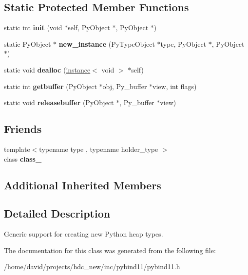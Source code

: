 \subsection*{Static Protected Member Functions}
\begin{DoxyCompactItemize}
\item 
static int {\bfseries init} (void $\ast$self, Py\+Object $\ast$, Py\+Object $\ast$)\hypertarget{classgeneric__type_acea3e51d079afc632cfb4514533e02d4}{}\label{classgeneric__type_acea3e51d079afc632cfb4514533e02d4}

\item 
static Py\+Object $\ast$ {\bfseries new\+\_\+instance} (Py\+Type\+Object $\ast$type, Py\+Object $\ast$, Py\+Object $\ast$)\hypertarget{classgeneric__type_ac4f8c2c592be8b4724591f65e5382a1c}{}\label{classgeneric__type_ac4f8c2c592be8b4724591f65e5382a1c}

\item 
static void {\bfseries dealloc} (\hyperlink{structinstance}{instance}$<$ void $>$ $\ast$self)\hypertarget{classgeneric__type_ad92581a3039032a4467720bd394b262a}{}\label{classgeneric__type_ad92581a3039032a4467720bd394b262a}

\item 
static int {\bfseries getbuffer} (Py\+Object $\ast$obj, Py\+\_\+buffer $\ast$view, int flags)\hypertarget{classgeneric__type_a34b0cf2e5806a0b9cb34f198d6bed13d}{}\label{classgeneric__type_a34b0cf2e5806a0b9cb34f198d6bed13d}

\item 
static void {\bfseries releasebuffer} (Py\+Object $\ast$, Py\+\_\+buffer $\ast$view)\hypertarget{classgeneric__type_aef00cb6d627ee107186379806172aeb5}{}\label{classgeneric__type_aef00cb6d627ee107186379806172aeb5}

\end{DoxyCompactItemize}
\subsection*{Friends}
\begin{DoxyCompactItemize}
\item 
{\footnotesize template$<$typename type , typename holder\+\_\+type $>$ }\\class {\bfseries class\+\_\+}\hypertarget{classgeneric__type_acadc9fb448c97cee16138b32836cb5ca}{}\label{classgeneric__type_acadc9fb448c97cee16138b32836cb5ca}

\end{DoxyCompactItemize}
\subsection*{Additional Inherited Members}


\subsection{Detailed Description}
Generic support for creating new Python heap types. 

The documentation for this class was generated from the following file\+:\begin{DoxyCompactItemize}
\item 
/home/david/projects/hdc\+\_\+new/inc/pybind11/pybind11.\+h\end{DoxyCompactItemize}
